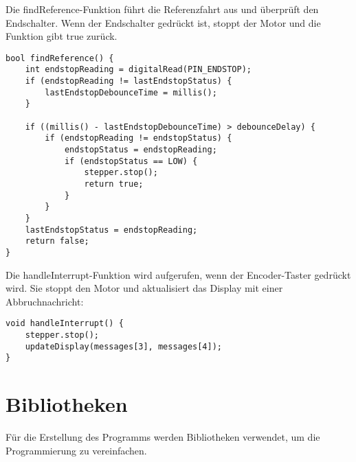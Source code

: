 Die findReference-Funktion führt die Referenzfahrt aus und überprüft den Endschalter. Wenn der Endschalter gedrückt ist, stoppt der Motor und die Funktion gibt true zurück.

\begin{lstlisting}
bool findReference() {
	int endstopReading = digitalRead(PIN_ENDSTOP);
	if (endstopReading != lastEndstopStatus) {
		lastEndstopDebounceTime = millis();
	}
	
	if ((millis() - lastEndstopDebounceTime) > debounceDelay) {
		if (endstopReading != endstopStatus) {
			endstopStatus = endstopReading;
			if (endstopStatus == LOW) {
				stepper.stop();
				return true;
			}
		}
	}
	lastEndstopStatus = endstopReading;
	return false;
}
\end{lstlisting}

Die handleInterrupt-Funktion wird aufgerufen, wenn der Encoder-Taster gedrückt wird. Sie stoppt den Motor und aktualisiert das Display mit einer Abbruchnachricht:

\begin{lstlisting}
void handleInterrupt() {
	stepper.stop();
	updateDisplay(messages[3], messages[4]);
}
\end{lstlisting}

\section{Bibliotheken}
Für die Erstellung des Programms werden Bibliotheken verwendet, um die Programmierung zu vereinfachen.

